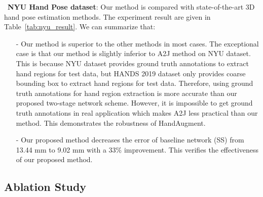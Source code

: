 \documentclass{article}
\begin{document}
~\textbf{NYU Hand Pose dataset}:
Our method is compared with state-of-the-art 3D hand pose estimation methods.
The experiment result are given in Table~\ref{tab:nyu_result}. We can summarize that:
\begin{itemize}
\item[-] Our method is superior to the other methods in most cases. The exceptional case is that our method is slightly inferior to A2J method on NYU dataset. This is because NYU dataset provides ground truth annotations to extract hand regions for test data, but HANDS 2019 dataset only provides coarse bounding box to extract hand regions for test data. Therefore, using ground truth annotations for hand region extraction is more accurate than our proposed two-stage network scheme. However, it is impossible to get ground truth annotations in real application which makes A2J less practical than our method.
This demonstrates the robustness of HandAugment.
\item[-] Our proposed method decreases the error of baseline network (SS) from 13.44 mm to 9.02 mm with a $33\%$ improvement. This verifies the effectiveness of our proposed method.
\end{itemize}



\subsection{Ablation Study}\label{sec:ablation}
\end{document}
